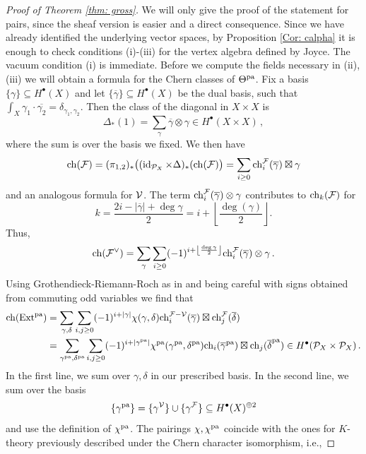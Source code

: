 \documentclass[a4paper, 12pt]{amsart}
\begin{document}
\begin{proof}[Proof of Theorem \ref{thm: gross}]
We will only give the proof of the statement for pairs, since the sheaf version is easier and a direct consequence. Since we have already identified the underlying vector spaces, by Proposition \ref{Cor: calpha} it is enough to check conditions (i)-(iii) for the vertex algebra defined by Joyce. The vacuum condition (i) is immediate. Before we compute the fields necessary in (ii), (iii) we will obtain a formula for the Chern classes of $\Theta^{\mathop{\rm pa}\nolimits}$. Fix a basis $\{\gamma\}\subseteq H^\bullet(X)$ and let $\{ \overline{\gamma}\}\subseteq H^\bullet(X)$ be the dual basis, such that $\int_X \gamma_1\cdot\overline{\gamma_2}=\delta_{\gamma_1,\gamma_2}$. Then the class of the diagonal in $X\times X$ is
\[\Delta_\ast(1)=\sum_{\gamma}\overline\gamma\otimes \gamma\in H^\bullet(X\times X)\,,\]
where the sum is over the basis we fixed. We then have
\begin{equation}\label{eq: chkunnethdescendents}\mathrm{ch}({\mathcal F})  = (\pi_{1,2})_\ast\big((\operatorname{id}_{{\mathcal P}_X}\times \Delta)_* (\mathrm{ch}({\mathcal F})\big) = \sum_{i\geq 0}\mathrm{ch}^{{\mathcal F}}_i(\overline{\gamma})\boxtimes\gamma 
\end{equation}
and an analogous formula for ${\mathcal V}$. The term $\mathrm{ch}_{i}^{\mathcal F}(\overline{\gamma})\otimes \gamma$ contributes to $\mathrm{ch}_k({\mathcal F})$ for \[k=\frac{2i-|\overline \gamma|+\deg \gamma}{2}=i+\left\lfloor\frac{\deg(\gamma)}{2}\right \rfloor.\]
Thus,
\[\mathrm{ch}({\mathcal F}^\vee)=\sum_{\gamma}\sum_{i\geq 0} (-1)^{i+\left\lfloor\frac{\deg \gamma}{2}\right \rfloor}\mathrm{ch}_{i}^{\mathcal F}(\overline{\gamma})\otimes \gamma\,.\]
 Using Grothendieck-Riemann-Roch as in \cite[Proposition 5.2]{Gr19} and being careful with signs obtained from commuting odd variables we find that
\begin{align}\nonumber 
\mathrm{ch}(\textup{Ext}^{\mathop{\rm pa}\nolimits}) &=\sum_{\gamma, \delta}\sum_{i, j\geq 0}(-1)^{i+|\gamma|}\chi(\gamma, \delta)\mathrm{ch}_i^{{\mathcal F}-{\mathcal V}}(\overline \gamma)\boxtimes\mathrm{ch}_j^{{\mathcal F}}(\overline \delta)\\
&=\sum_{\gamma^{\mathop{\rm pa}\nolimits}, \delta^{\mathop{\rm pa}\nolimits}}\sum_{i, j\geq 0}(-1)^{i+|\gamma^{\mathop{\rm pa}\nolimits}|}\chi^{\mathop{\rm pa}\nolimits}(\gamma^{\mathop{\rm pa}\nolimits}, \delta^{\mathop{\rm pa}\nolimits})\mathrm{ch}_i(\overline \gamma^{\mathop{\rm pa}\nolimits})\boxtimes\mathrm{ch}_j(\overline \delta^{\mathop{\rm pa}\nolimits})\in H^\bullet({\mathcal P}_X\times {\mathcal P}_X)\,.\label{eq: chextpa}
\end{align}
In the first line, we sum over $\gamma, \delta$ in our prescribed basis. In the second line, we sum over the basis 
\[\{\gamma^{\mathop{\rm pa}\nolimits}\}=\{\gamma^{\mathcal V}\}\cup \{\gamma^{\mathcal F}\}\subseteq H^\bullet(X)^{\oplus 2}\]
and use the definition of $\chi^{\mathop{\rm pa}\nolimits}$.
The pairings $\chi, \chi^{\mathop{\rm pa}\nolimits}$ coincide with the ones for $K$-theory previously described under the Chern character isomorphism, i.e.,

\end{proof}
\end{document}
